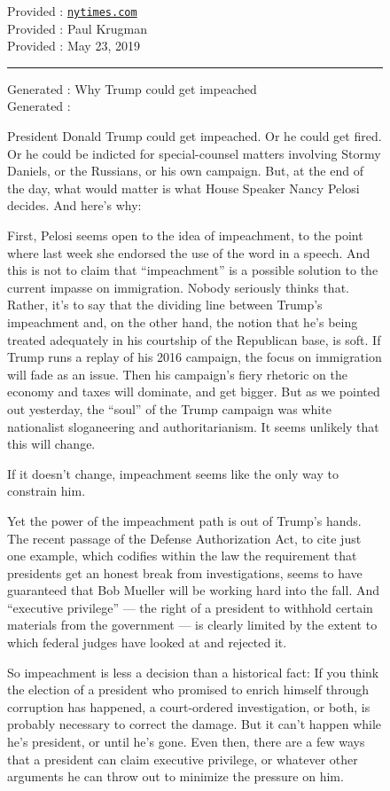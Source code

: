 \documentclass{article}
\begin{document}
\begin{figure}[t]
Provided \domainfield: {\tt\small \href{https://nytimes.com}{nytimes.com}} \\
Provided \authorfield: Paul Krugman \\
Provided \datefield: May 23, 2019

\hrule
Generated \headlinefield: Why Trump could get impeached \\
Generated \bodyfield:
{\small
President Donald Trump could get impeached. Or he could get fired. Or he could be indicted for special-counsel matters involving Stormy Daniels, or the Russians, or his own campaign. But, at the end of the day, what would matter is what House Speaker Nancy Pelosi decides. And here’s why:

First, Pelosi seems open to the idea of impeachment, to the point where last week she endorsed the use of the word in a speech. And this is not to claim that “impeachment” is a possible solution to the current impasse on immigration. Nobody seriously thinks that. Rather, it’s to say that the dividing line between Trump’s impeachment and, on the other hand, the notion that he’s being treated adequately in his courtship of the Republican base, is soft. If Trump runs a replay of his 2016 campaign, the focus on immigration will fade as an issue. Then his campaign’s fiery rhetoric on the economy and taxes will dominate, and get bigger. But as we pointed out yesterday, the “soul” of the Trump campaign was white nationalist sloganeering and authoritarianism. It seems unlikely that this will change.

If it doesn’t change, impeachment seems like the only way to constrain him.

Yet the power of the impeachment path is out of Trump’s hands. The recent passage of the Defense Authorization Act, to cite just one example, which codifies within the law the requirement that presidents get an honest break from investigations, seems to have guaranteed that Bob Mueller will be working hard into the fall. And “executive privilege” — the right of a president to withhold certain materials from the government — is clearly limited by the extent to which federal judges have looked at and rejected it.

So impeachment is less a decision than a historical fact: If you think the election of a president who promised to enrich himself through corruption has happened, a court-ordered investigation, or both, is probably necessary to correct the damage. But it can’t happen while he’s president, or until he’s gone. Even then, there are a few ways that a president can claim executive privilege, or whatever other arguments he can throw out to minimize the pressure on him.

}
\end{figure}
\end{document}
